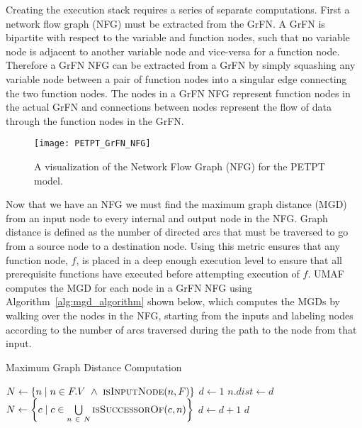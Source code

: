 Creating the execution stack requires a series of separate computations.
First a network flow graph (NFG) \citep{allen1970CFG} must be extracted from the GrFN.
A GrFN is bipartite \citep{bondy1976graph} with respect to the variable and function nodes, such that no variable node is adjacent to another variable node and vice-versa for a function node.
Therefore a GrFN NFG can be extracted from a GrFN by simply squashing any variable node between a pair of function nodes into a singular edge connecting the two function nodes.
The nodes in a GrFN NFG represent function nodes in the actual GrFN and connections between nodes represent the flow of data through the function nodes in the GrFN.

\FloatBarrier
\begin{figure}[!htbp]
    \centering
    \texttt{[image: PETPT\_GrFN\_NFG]}%
    \caption[PETPT GrFN Network Flow Graph]{A visualization of the Network Flow Graph (NFG) for the PETPT model.}
    \label{fig:petpt_nfg}
\end{figure}
\FloatBarrier

Now that we have an NFG we must find the maximum graph distance (MGD) from an input node to every internal and output node in the NFG.
Graph distance is defined as the number of directed arcs that must be traversed to go from a source node to a destination node.
Using this metric ensures that any function node, $f$, is placed in a deep enough execution level to ensure that all prerequisite functions have executed before attempting execution of $f$.
UMAF computes the MGD for each node in a GrFN NFG using Algorithm~\ref{alg:mgd_algorithm} shown below, which computes the MGDs by walking over the nodes in the NFG, starting from the inputs and labeling nodes according to the number of arcs traversed during the path to the node from that input.

\FloatBarrier
\begin{algorithm}
  \caption{Maximum Graph Distance Computation}
  \label{alg:mgd_algorithm}
  \begin{algorithmic}[1]
     
      \State $N \gets \{n \mid n \in F.V~\land~\Call{isInputNode}{n, F} \}$ 
      \State $d \gets 1$
          \State $n.dist \gets d$ 
        \EndFor
      	\State $N \gets \left\{ c \mid c \in \bigcup\limits_{n~\in~N}^{} \Call{isSuccessorOf}{c, n} \right\}$ 
        \State $d \gets d + 1$
      \EndWhile
      \State \Return $d$
    \EndProcedure
  \end{algorithmic}
\end{algorithm}

